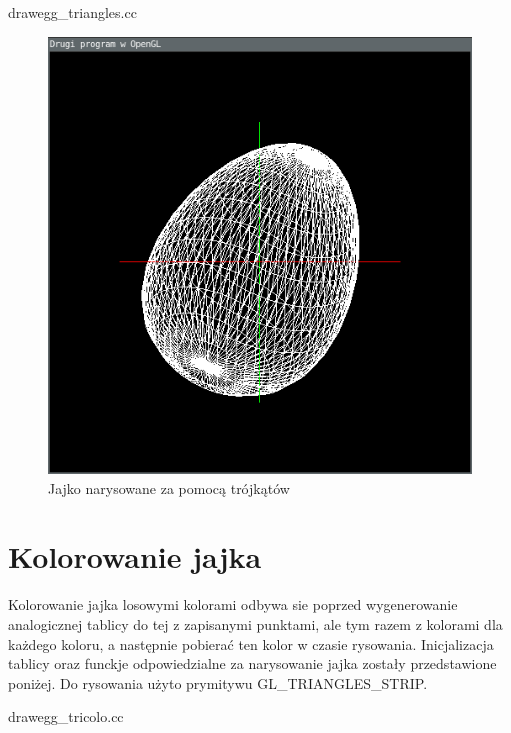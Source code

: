 \documentclass[polish,polish,a4paper]{report}
\begin{document}

{drawegg_triangles.cc}

\pagebreak

\begin{figure}[!htb]
\begin{center}
\includegraphics[width=\textwidth]{eggtriangles}
\caption{Jajko narysowane za pomocą trójkątów}
\end{center}
\end{figure}

\pagebreak

\section{Kolorowanie jajka}
Kolorowanie jajka losowymi kolorami odbywa sie poprzed wygenerowanie analogicznej tablicy do tej z zapisanymi punktami, ale tym razem z kolorami dla
każdego koloru, a następnie pobierać ten kolor w czasie rysowania. Inicjalizacja tablicy oraz funckje odpowiedzialne za narysowanie jajka zostały
przedstawione poniżej. Do rysowania użyto prymitywu GL\_TRIANGLES\_STRIP.


{drawegg_tricolo.cc}

\pagebreak
\end{document}
